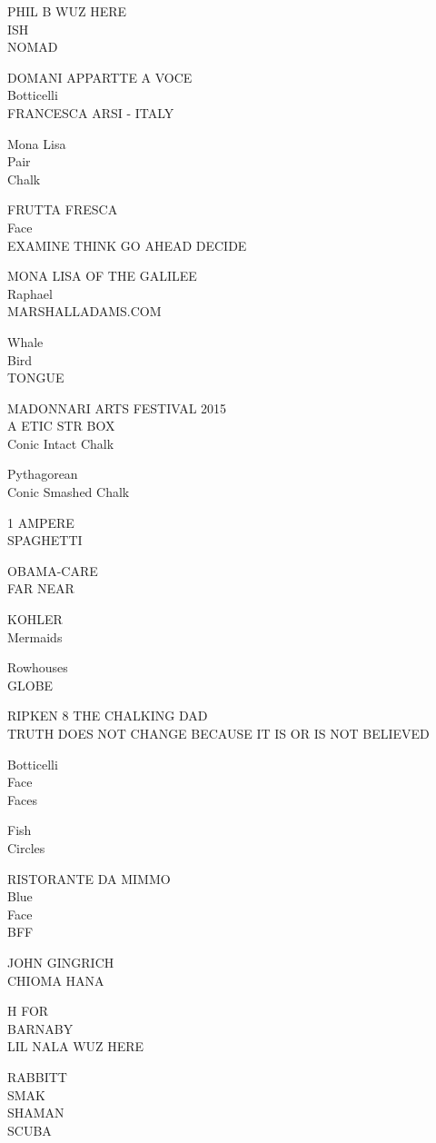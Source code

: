 \documentclass[10pt,letterpaper]{article}
\begin{document}
PHIL B WUZ HERE\\
ISH\\
NOMAD

DOMANI APPARTTE A VOCE\\
Botticelli\\
FRANCESCA ARSI {-} ITALY

Mona Lisa\\
Pair\\
Chalk

FRUTTA FRESCA\\
Face\\
EXAMINE THINK GO AHEAD DECIDE

MONA LISA OF THE GALILEE\\
Raphael\\
MARSHALLADAMS.COM

Whale\\
Bird\\
TONGUE

MADONNARI ARTS FESTIVAL 2015\\
A ETIC STR BOX\\
Conic Intact Chalk

Pythagorean\\
Conic Smashed Chalk

1 AMPERE\\
SPAGHETTI

OBAMA{-}CARE\\
FAR NEAR

KOHLER\\
Mermaids

Rowhouses\\
GLOBE

RIPKEN 8 THE CHALKING DAD\\
TRUTH DOES NOT CHANGE BECAUSE IT IS OR IS NOT BELIEVED

Botticelli\\
Face\\
Faces

Fish\\
Circles

RISTORANTE DA MIMMO\\
Blue\\
Face\\
BFF

JOHN GINGRICH\\
CHIOMA HANA

H FOR\\
BARNABY\\
LIL NALA WUZ HERE

RABBITT\\
SMAK\\
SHAMAN\\
SCUBA
\end{document}
